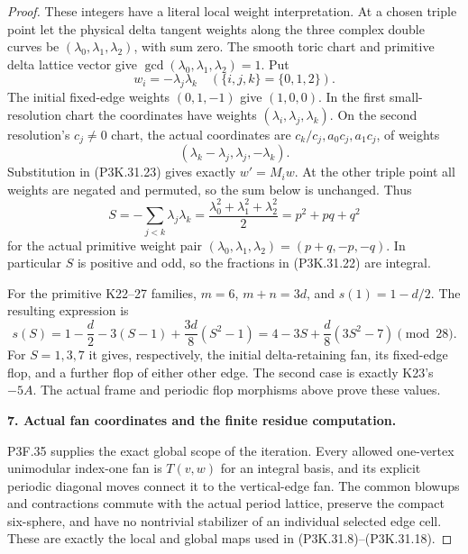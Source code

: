 \begin{proof}
These integers have a literal local weight interpretation.
At a chosen triple point let the physical delta tangent
weights along the three complex double curves be
\((\lambda_0,\lambda_1,\lambda_2)\), with sum zero.
The smooth toric chart and primitive delta lattice vector
give \(\gcd(\lambda_0,\lambda_1,\lambda_2)=1\).
Put
\[
              w_i=-\lambda_j\lambda_k\quad
                     (\{i,j,k\}=\{0,1,2\}).
                                                        \tag{P3K.31.23}
\]
The initial fixed-edge weights \((0,1,-1)\) give
\((1,0,0)\). In the first small-resolution chart the
coordinates have weights \((\lambda_i,\lambda_j,\lambda_k)\).
On the second resolution's \(c_j\ne0\) chart, the actual
coordinates are \(c_k/c_j,a_0c_j,a_1c_j\), of weights
\[
                  (\lambda_k-\lambda_j,\lambda_j,-\lambda_k).
                                                        \tag{P3K.31.24}
\]
Substitution in (P3K.31.23) gives exactly \(w'=M_iw\).
At the other triple point all weights are negated and
permuted, so the sum below is unchanged. Thus
\[
             S=-\sum_{j<k}\lambda_j\lambda_k
               =\frac{\lambda_0^2+\lambda_1^2+\lambda_2^2}{2}
               =p^2+pq+q^2
                                                        \tag{P3K.31.25}
\]
for the actual primitive weight pair
\((\lambda_0,\lambda_1,\lambda_2)=(p+q,-p,-q)\).
In particular \(S\) is positive and odd, so the fractions
in (P3K.31.22) are integral.

For the primitive K22--27 families, \(m=6\), \(m+n=3d\),
and \(s(1)=1-d/2\). The resulting expression is
\[
        s(S)=1-\frac d2-3(S-1)+\frac{3d}{8}(S^2-1)
             =4-3S+\frac d8(3S^2-7)\pmod{28}.
                                                        \tag{P3K.31.26}
\]
For \(S=1,3,7\) it gives, respectively, the initial
delta-retaining fan, its fixed-edge flop, and a further
flop of either other edge. The second case is exactly
K23's \(-5A\). The actual frame and periodic flop morphisms above prove these values.

\par\medskip\noindent\textbf{7. Actual fan coordinates and the finite residue computation.}\enspace

P3F.35 supplies the exact global scope of the iteration.
Every allowed one-vertex unimodular index-one fan is
\(T(v,w)\) for an integral basis, and its explicit
periodic diagonal moves connect it to the vertical-edge
fan. The common blowups and contractions commute with
the actual period lattice, preserve the compact
six-sphere, and have no nontrivial stabilizer of an
individual selected edge cell. These are exactly the
local and global maps used in (P3K.31.8)--(P3K.31.18).


\end{proof}
